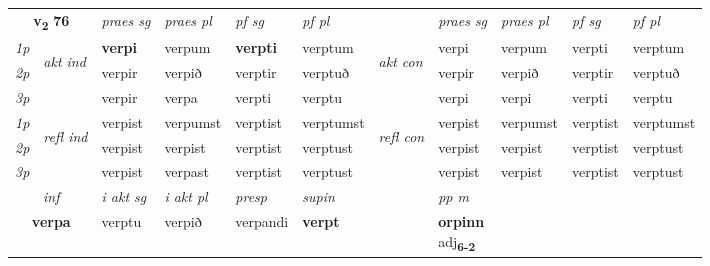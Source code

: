 \noindent
\begin{tabular}{lllllllllll} \toprule
\multicolumn{2}{c}{\textbf{v{\textsubscript{2}}} \Large{\textbf{76}}}  &  \textit{praes sg}  & \textit{praes pl}  &\textit{ pf sg} & \textit{pf pl} &  &  \textit{praes sg}  & \textit{praes pl}  & \textit{pf sg} & \textit{pf pl } \\*
	\cmidrule{3-6} \cmidrule{8-11}
 {\textit{1p}} & \multirow{3}{*}{\begin{turn}{90}\textit{akt ind}\end{turn}} & \textbf{verpi} & verpum & \textbf{verpti} & verptum & \multirow{3}{*}{\begin{turn}{90}\textit{akt con}\end{turn}} &verpi & verpum & verpti & verptum\\*
 {\textit{2p}} &  &  verpir  & verpið & verptir & verptuð & & verpir & verpið & verptir & verptuð \\*
{\textit{3p}} &  & verpir & verpa & verpti & verptu & & verpi & verpi& verpti & verptu \\*
\cmidrule{3-6} \cmidrule{8-11}
 {\textit{1p}} & \multirow{3}{*}{\begin{turn}{90}\textit{refl ind}\end{turn}}  & verpist & verpumst & verptist & verptumst & \multirow{3}{*}{\begin{turn}{90}\textit{refl con}\end{turn}}  &verpist & verpumst & verptist & verptumst \\*
 {\textit{2p}} &  & verpist & verpist & verptist & verptust & &verpist & verpist & verptist & verptust \\*
 {\textit{3p}}  & & verpist & verpast & verptist & verptust & & verpist & verpist& verptist & verptust \\*
\cmidrule{3-6} \cmidrule{8-11}

   \multicolumn{2}{c}{\textit{inf}}  & \textit{i akt sg} & \textit{i akt pl}   & \textit{presp} & \textit{supin}  && \textit{pp m} \\*
  \multicolumn{2}{c}{\textbf{verpa}} & verptu  & verpið   & verpandi &  \textbf{verpt}  && \specialcell{\textbf{orpinn} \\ adj\textbf{\textsubscript{6-2}}} \\*
\end{tabular}

